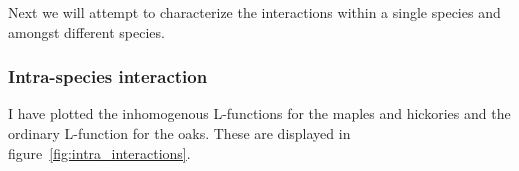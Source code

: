 \documentclass[12pt,a4paper,oneside,article]{memoir}
\begin{document}
Next we will attempt to characterize the interactions within a single species
and amongst different species.

\subsubsection{Intra-species interaction}

I have plotted the inhomogenous L-functions \cite{illian}\cite{gelfand} for the maples
and hickories and the ordinary L-function for the oaks.
These are displayed in figure~\ref{fig:intra_interactions}.



\begin{figure}[htb]
  \begin{adjustwidth}{-2in}{-2in}
	  \centering
	  \\

\end{adjustwidth}
\end{figure}
\end{document}
